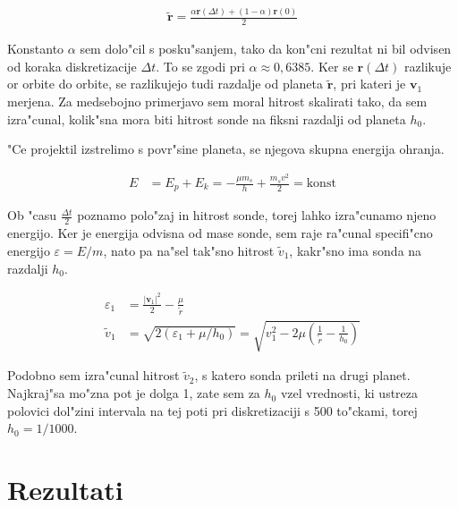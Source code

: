 \documentclass[a4paper,10pt]{article}
\renewcommand{\vec}{\mathbf}
\newcommand{\eps}{\varepsilon}
\begin{document}
\begin{align}
 \vec{\tilde r} = \frac{\alpha \vec r(\Delta t) + (1-\alpha) \vec r(0)}{2} \label{eq:skalirana-hitrost}
\end{align}

Konstanto $\alpha$ sem dolo"cil s posku"sanjem, tako da kon"cni rezultat ni bil odvisen od koraka diskretizacije $\Delta t$. To se zgodi pri $\alpha \approx 0,\!6385$. Ker se $\vec r(\Delta t)$ razlikuje or orbite do orbite, se razlikujejo tudi razdalje od planeta $\vec{\tilde r}$, pri kateri je $\vec v_1$ merjena. Za medsebojno primerjavo sem moral hitrost skalirati tako, da sem izra"cunal, kolik"sna mora biti hitrost sonde na fiksni razdalji od planeta $h_0$. 

"Ce projektil izstrelimo s povr"sine planeta, se njegova skupna energija ohranja. 

\begin{align}
 E &= E_p + E_k = -\frac{\mu m_s}{h} + \frac{m_s v^2}{2} = \mathrm{konst}
\end{align}

Ob "casu $\frac{\Delta t}{2}$ poznamo polo"zaj in hitrost sonde, torej lahko izra"cunamo njeno energijo. Ker je energija odvisna od mase sonde, sem raje ra"cunal specifi"cno energijo $\eps = E/m$, nato pa na"sel tak"sno hitrost $\tilde{v}_1$, kakr"sno ima sonda na razdalji $h_0$. 

\begin{align}
 \eps_1 &= \frac{|\vec v_1|^2}{2} - \frac{\mu}{\tilde r}  \\
 \tilde v_1 &= \sqrt{2(\eps_1 + \mu/h_0)} = \sqrt{v_1^2 - 2\mu \left(\frac{1}{\tilde r} - \frac{1}{h_0}\right)}
\end{align}

Podobno sem izra"cunal hitrost $\tilde v_2$, s katero sonda prileti na drugi planet. Najkraj"sa mo"zna pot je dolga 1, zate sem za $h_0$ vzel vrednosti, ki ustreza polovici dol"zini intervala na tej poti pri diskretizaciji s 500 to"ckami, torej $h_0 = 1/1000$. 

\section{Rezultati}

\end{document}
